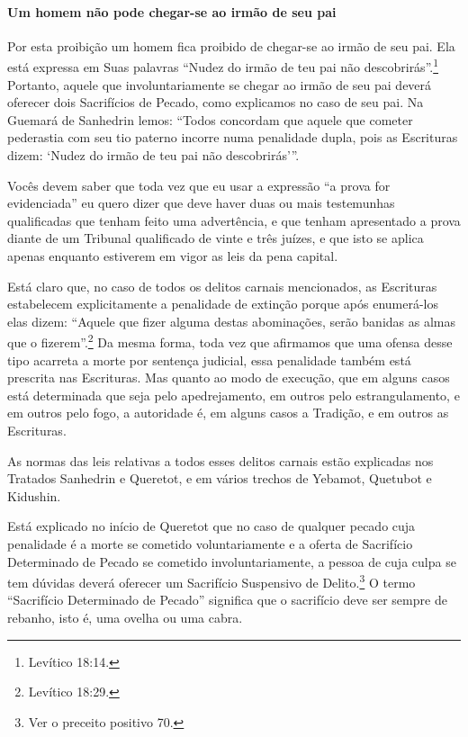\paragraph{Um homem não pode chegar-se ao irmão de seu pai}

Por esta proibição um homem fica proibido de chegar-se ao irmão de seu
pai. Ela está expressa em Suas palavras ``Nudez do irmão de teu pai não
descobrirás''.\footnote{Levítico 18:14.} Portanto, aquele que involuntariamente
se chegar ao irmão de seu pai deverá oferecer dois Sacrifícios de
Pecado, como explicamos no caso de seu pai. Na Guemará de Sanhedrin
lemos: ``Todos concordam que aquele que cometer pederastia com seu tio
paterno incorre numa penalidade dupla, pois as Escrituras dizem: `Nudez
do irmão de teu pai não descobrirás'''.

Vocês devem saber que toda vez que eu usar a expressão ``a prova
for evidenciada'' eu quero dizer que deve haver duas ou mais testemunhas
qualificadas que tenham feito uma advertência, e que tenham apresentado
a prova diante de um Tribunal qualificado de vinte e três juízes, e que
isto se aplica apenas enquanto estiverem em vigor as leis da pena
capital.

Está claro que, no caso de todos os delitos carnais mencionados, as
Escrituras estabelecem explicitamente a penalidade de extinção porque
após enumerá-los elas dizem: ``Aquele que fizer alguma destas
abominações, serão banidas as almas que o fizerem''.\footnote{Levítico 18:29.} Da
mesma forma, toda vez que afirmamos que uma ofensa desse tipo acarreta a
morte por sentença judicial, essa penalidade também está prescrita nas
Escrituras. Mas quanto ao modo de execução, que em alguns casos está
determinada que seja pelo apedrejamento, em outros pelo estrangulamento,
e em outros pelo fogo, a autoridade é, em alguns casos a Tradição, e em
outros as Escrituras.

As normas das leis relativas a todos esses delitos carnais estão
explicadas nos Tratados Sanhedrin e Queretot, e em vários trechos de
Yebamot, Quetubot e Kidushin.

Está explicado no início de Queretot que no caso de qualquer pecado
cuja penalidade é a morte se cometido voluntariamente e a oferta de
Sacrifício Determinado de Pecado se cometido involuntariamente, a
pessoa de cuja culpa se tem dúvidas deverá oferecer um Sacrifício
Suspensivo de Delito.\footnote{Ver o preceito positivo 70.} O termo ``Sacrifício
Determinado de Pecado'' significa que o sacrifício deve ser sempre de
rebanho, isto é, uma ovelha ou uma cabra.

